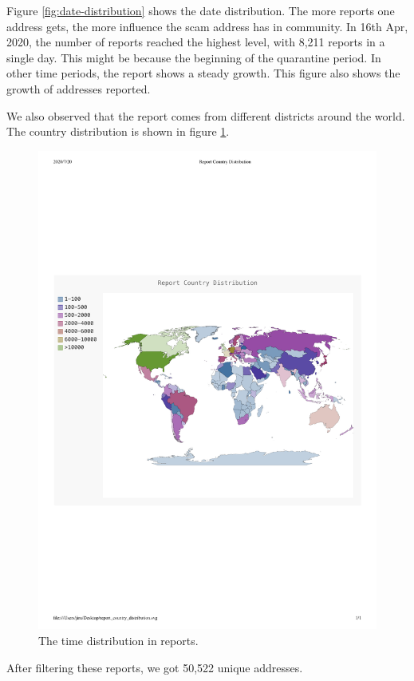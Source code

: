 Figure \ref{fig:date-distribution} shows the date distribution. The more reports one address gets, the more influence the scam address has in community. In 16th Apr, 2020, the number of reports reached the highest level, with 8,211 reports in a single day. This might be because the beginning of the quarantine period. In other time periods, the report shows a steady growth. This figure also shows the growth of addresses reported.

We also observed that the report comes from different districts around the world. The country distribution is shown in figure  \ref{fig:country-distribution}.

\begin{figure}[tbp]
\centerline{\includegraphics[width=\columnwidth]{images/report_country_distribution.pdf}}
\caption{The time distribution in reports.}
\label{fig:country-distribution}
\end{figure}

After filtering these reports, we got 50,522 unique addresses.




\noindent{}






